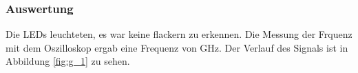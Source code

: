 \documentclass[12pt,a4paper]{article}
\begin{document}
\subsubsection*{Auswertung}

Die LEDs leuchteten, es war keine flackern zu erkennen. Die Messung der Frquenz mit dem Oszilloskop ergab eine Frequenz von \unit[2,4]{GHz}. Der Verlauf des Signals ist in Abbildung \ref{fig:g_1} zu sehen.
\end{document}
